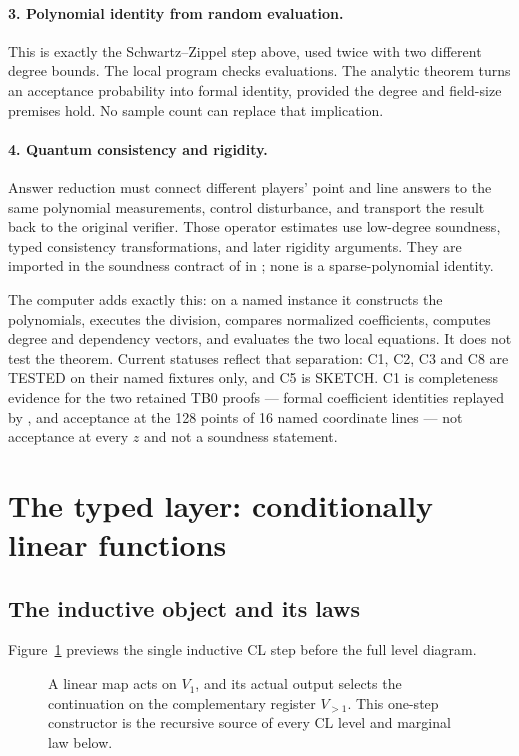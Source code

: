 \paragraph{3. Polynomial identity from random evaluation.}
This is exactly the Schwartz--Zippel step above, used twice with two different
degree bounds.  The local program checks evaluations.  The analytic theorem
turns an acceptance probability into formal identity, provided the degree and
field-size premises hold.  No sample count can replace that implication.

\paragraph{4. Quantum consistency and rigidity.}
Answer reduction must connect different players' point and line answers to the
same polynomial measurements, control disturbance, and transport the result
back to the original verifier.  Those operator estimates use low-degree
soundness, typed consistency transformations, and later rigidity arguments.  They
are imported in the soundness contract of  in
; none is a sparse-polynomial
identity.

The computer adds exactly this: on a named instance it constructs the
polynomials, executes the division, compares normalized coefficients, computes
degree and dependency vectors, and evaluates the two local equations.  It does
not test the theorem.  Current statuses reflect that separation: C1, C2, C3
and C8 are \textsc{TESTED} on their named fixtures only, and C5 is
\textsc{SKETCH}.  C1 is completeness evidence for the two retained TB0 proofs
--- formal coefficient identities replayed by , and
 acceptance at the 128 points of 16 named coordinate lines
--- not acceptance at every \(z\) and not a soundness statement.

\section{The typed layer: conditionally linear functions}
\label{sec:typed-layer}

\subsection{The inductive object and its laws}

Figure~\ref{fig:D-cl-base-step} previews the single inductive CL step before
the full level diagram.
\begin{figure}[H]
\centering

\caption{A linear map acts on \(V_1\), and its actual output selects the continuation on the complementary register \(V_{>1}\).  This one-step constructor is the recursive source of every CL level and marginal law below.}
\label{fig:D-cl-base-step}
\end{figure}

